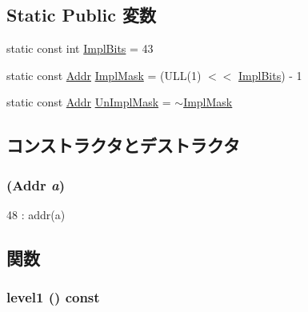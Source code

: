 \subsection*{Static Public 変数}
\begin{DoxyCompactItemize}
\item 
static const int \hyperlink{structAlphaISA_1_1VAddr_a90a805e8bf3e59628bdcc4ca67fc68c4}{ImplBits} = 43
\item 
static const \hyperlink{classm5_1_1params_1_1Addr}{Addr} \hyperlink{structAlphaISA_1_1VAddr_af9099d6c5264dd55210ff2a90bec4c2e}{ImplMask} = (ULL(1) $<$$<$ \hyperlink{structAlphaISA_1_1VAddr_a90a805e8bf3e59628bdcc4ca67fc68c4}{ImplBits}) -\/ 1
\item 
static const \hyperlink{classm5_1_1params_1_1Addr}{Addr} \hyperlink{structAlphaISA_1_1VAddr_aea265d87906fd130da86ab5d0977f26a}{UnImplMask} = $\sim$\hyperlink{structAlphaISA_1_1VAddr_af9099d6c5264dd55210ff2a90bec4c2e}{ImplMask}
\end{DoxyCompactItemize}


\subsection{コンストラクタとデストラクタ}
\hypertarget{structAlphaISA_1_1VAddr_aea4be566b2249d0b69dcee270c8b461d}{
\subsubsection[{VAddr}]{ ({\bf Addr} {\em a})}}
\label{structAlphaISA_1_1VAddr_aea4be566b2249d0b69dcee270c8b461d}



\begin{DoxyCode}
48 : addr(a) {}
\end{DoxyCode}


\subsection{関数}
\hypertarget{structAlphaISA_1_1VAddr_a6fac2640aa06dbd7e9cf8af5b81f8969}{
\subsubsection[{level1}]{ level1 () const}}
\label{structAlphaISA_1_1VAddr_a6fac2640aa06dbd7e9cf8af5b81f8969}



